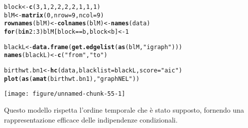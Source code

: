 \documentclass{article}\usepackage[]{graphicx}\usepackage[]{color}
\makeatletter
\def\maxwidth{ %
  \ifdim\Gin@nat@width>\linewidth
    \linewidth
  \else
    \Gin@nat@width
  \fi
}
\newcommand{\hlnum}[1]{\textcolor[rgb]{0.686,0.059,0.569}{#1}}%
\newcommand{\hlstr}[1]{\textcolor[rgb]{0.192,0.494,0.8}{#1}}%
\newcommand{\hlopt}[1]{\textcolor[rgb]{0,0,0}{#1}}%
\newcommand{\hlstd}[1]{\textcolor[rgb]{0.345,0.345,0.345}{#1}}%
\newcommand{\hlkwa}[1]{\textcolor[rgb]{0.161,0.373,0.58}{\textbf{#1}}}%
\newcommand{\hlkwb}[1]{\textcolor[rgb]{0.69,0.353,0.396}{#1}}%
\newcommand{\hlkwc}[1]{\textcolor[rgb]{0.333,0.667,0.333}{#1}}%
\newcommand{\hlkwd}[1]{\textcolor[rgb]{0.737,0.353,0.396}{\textbf{#1}}}%
\newenvironment{kframe}{%
 \def\at@end@of@kframe{}%
 \ifinner\ifhmode%
  \def\at@end@of@kframe{\end{minipage}}%
  \begin{minipage}{\columnwidth}%
 \fi\fi%
 \def\FrameCommand##1{\hskip\@totalleftmargin \hskip-\fboxsep
 \colorbox{shadecolor}{##1}\hskip-\fboxsep
     \hskip-\linewidth \hskip-\@totalleftmargin \hskip\columnwidth}%
 \MakeFramed {\advance\hsize-\width
   \@totalleftmargin\z@ \linewidth\hsize
   \@setminipage}}%
 {\par\unskip\endMakeFramed%
 \at@end@of@kframe}
\newenvironment{knitrout}{}{} %
\makeatother
\begin{document}
\begin{knitrout}
\color{fgcolor}\begin{kframe}
\begin{alltt}
\hlstd{block} \hlkwb{<-} \hlkwd{c}\hlstd{(}\hlnum{3}\hlstd{,}\hlnum{1}\hlstd{,}\hlnum{2}\hlstd{,}\hlnum{2}\hlstd{,}\hlnum{2}\hlstd{,}\hlnum{2}\hlstd{,}\hlnum{1}\hlstd{,}\hlnum{1}\hlstd{,}\hlnum{1}\hlstd{)}
\hlstd{blM} \hlkwb{<-} \hlkwd{matrix}\hlstd{(}\hlnum{0}\hlstd{,}\hlkwc{nrow}\hlstd{=}\hlnum{9}\hlstd{,}\hlkwc{ncol}\hlstd{=}\hlnum{9}\hlstd{)}
\hlkwd{rownames}\hlstd{(blM)} \hlkwb{<-} \hlkwd{colnames}\hlstd{(blM)} \hlkwb{<-} \hlkwd{names}\hlstd{(data)}
\hlkwa{for} \hlstd{(b} \hlkwa{in} \hlnum{2}\hlopt{:}\hlnum{3}\hlstd{) blM[block}\hlopt{==}\hlstd{b,block}\hlopt{<}\hlstd{b]} \hlkwb{<-} \hlnum{1}

\hlstd{blackL} \hlkwb{<-} \hlkwd{data.frame}\hlstd{(}\hlkwd{get.edgelist}\hlstd{(}\hlkwd{as}\hlstd{(blM,}\hlstr{"igraph"}\hlstd{)))}
\hlkwd{names}\hlstd{(blackL)} \hlkwb{<-} \hlkwd{c}\hlstd{(}\hlstr{"from"}\hlstd{,} \hlstr{"to"}\hlstd{)}

\hlstd{birthwt.bn1} \hlkwb{<-} \hlkwd{hc}\hlstd{(data,}\hlkwc{blacklist}\hlstd{=blackL,}\hlkwc{score}\hlstd{=}\hlstr{"aic"}\hlstd{)}
\hlkwd{plot}\hlstd{(}\hlkwd{as}\hlstd{(}\hlkwd{amat}\hlstd{(birthwt.bn1),}\hlstr{"graphNEL"}\hlstd{))}
\end{alltt}
\end{kframe}
\texttt{[image: figure/unnamed-chunk-55-1]} 
\end{knitrout}

Questo modello rispetta l'ordine temporale che è stato supposto, fornendo una rappresentazione efficace delle indipendenze condizionali.
\end{document}
